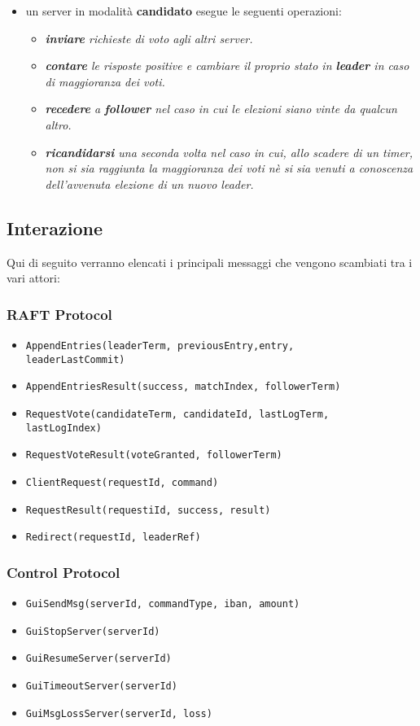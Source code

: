 \begin{itemize}
	\item un server in modalità \textbf{candidato} esegue le seguenti operazioni:
	\begin{itemize}
		\item \emph{\textbf{inviare} richieste di voto agli altri server.}
		\item \emph{\textbf{contare} le risposte positive e cambiare il proprio stato in \textbf{leader} in caso di maggioranza dei voti.}
		\item \emph{\textbf{recedere} a \textbf{follower} nel caso in cui le elezioni siano vinte da qualcun altro.}
		\item \emph{\textbf{ricandidarsi} una seconda volta nel caso in cui, allo scadere di un timer, non si sia raggiunta la maggioranza dei voti nè si sia venuti a conoscenza dell'avvenuta elezione di un nuovo leader.}			  		
	\end{itemize}
\end{itemize}


\subsection{Interazione}
Qui di seguito verranno elencati i principali messaggi che vengono scambiati tra i vari attori:

	\subsubsection{RAFT Protocol}
		\begin{itemize}
			\item{\texttt{AppendEntries(leaderTerm, previousEntry,entry,\\
			 leaderLastCommit) }}
			\item{\texttt{AppendEntriesResult(success, matchIndex, followerTerm) }}
			\item{\texttt{RequestVote(candidateTerm, candidateId, lastLogTerm,\\
			 lastLogIndex)}}
			\item{\texttt{RequestVoteResult(voteGranted, followerTerm)}}
			\item{\texttt{ClientRequest(requestId, command)}}
			\item{\texttt{RequestResult(requestiId, success, result)}}
			\item{\texttt{Redirect(requestId, leaderRef)}}
		\end{itemize}

	\subsubsection{Control Protocol}
		\begin{itemize}
			\item{\texttt{GuiSendMsg(serverId, commandType, iban, amount)}}
			\item{\texttt{GuiStopServer(serverId)}}
			\item{\texttt{GuiResumeServer(serverId)}}
			\item{\texttt{GuiTimeoutServer(serverId)}}
			\item{\texttt{GuiMsgLossServer(serverId, loss)}}
		\end{itemize}